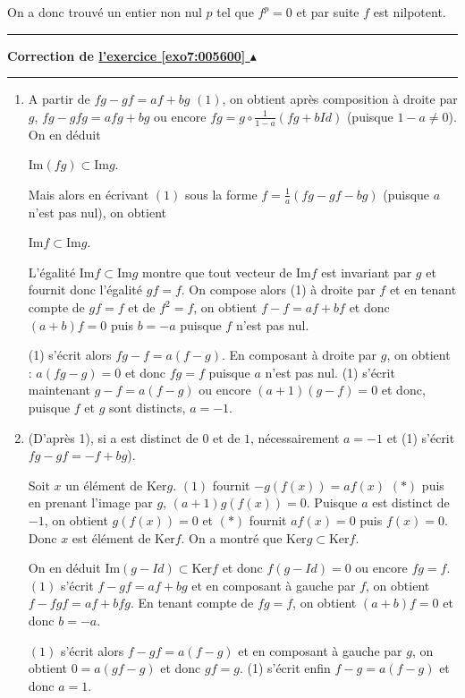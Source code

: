 \documentclass[11pt,a4paper]{article}
\newcounter{exo}
\newcommand{\correction}[1]{\hypertarget{cor7:#1}{}\label{cor7:#1}{\bf Correction de \hyperlink{exo7:#1}{l'exercice \ref{exo7:#1} $\blacktriangle$}}\vspace{1mm}\hrule\vspace{1mm}}
\newcommand{\fincorrection}{\vspace{1mm}\hrule\vspace*{7mm}}
\begin{document}
On a donc trouvé un entier non nul $p$ tel que $f^p=0$ et par suite $f$ est nilpotent.
\fincorrection
\correction{005600}
\begin{enumerate}
 \item  A partir de $fg-gf=af+bg$ $(1)$, on obtient après composition à droite par $g$, $fg-gfg = afg + bg$ ou encore $fg=g\circ\frac{1}{1-a}(fg + bId)$ (puisque $1 - a\neq0$). On en déduit

\begin{center} 
$\text{Im}(fg)\subset\text{Im}g$.
\end{center}

Mais alors en écrivant $(1)$ sous la forme $f=\frac{1}{a}(fg- gf -bg)$ (puisque $a$ n'est pas nul), on obtient

\begin{center}
$\text{Im}f\subset\text{Im}g$.
\end{center}

L'égalité $\text{Im}f\subset\text{Im}g$ montre que tout vecteur de $\text{Im}f$ est invariant par $g$ et  fournit donc l'égalité $gf = f$. On compose alors (1) à droite par $f$ et en tenant compte de $gf = f$ et de $f^2 = f$, on obtient $f - f = af + bf$ et donc $(a+b)f = 0$ puis $b=-a$ puisque $f$ n'est pas nul.

(1) s'écrit alors $fg - f = a(f-g)$. En composant à droite par $g$, on obtient : $a(fg - g) = 0$ et donc $fg = f$ puisque $a$ n'est pas nul. (1) s'écrit maintenant $g-f = a(f-g)$ ou encore $(a+1)(g - f) = 0$ et donc, puisque $f$ et $g$ sont distincts, $a = -1$.

\item  (D'après 1), si a est distinct de $0$ et de $1$, nécessairement $a = -1$ et (1) s'écrit $fg - gf =-f +bg$).

Soit $x$ un élément de $\text{Ker}g$. $(1)$ fournit $-g(f(x)) = af(x)$ $(*)$ puis en prenant l'image par $g$, $(a+1)g(f(x)) = 0$. Puisque $a$ est distinct de $-1$, on obtient $g(f(x)) = 0$ et $(*)$ fournit $af(x) = 0$ puis $f(x) = 0$. Donc $x$ est élément de $\text{Ker}f$. On a montré que $\text{Ker}g\subset\text{Ker}f$.

On en déduit $\text{Im}(g-Id)\subset\text{Ker}f$ et donc $f(g-Id) =0$ ou encore $fg = f$. $(1)$ s'écrit $f - gf = af + bg$ et en composant à gauche par $f$, on obtient $f - fgf = af + bfg$. En tenant compte de $fg = f$, on obtient  $(a+b)f = 0$ et donc $b = -a$.

$(1)$ s'écrit alors $f - gf = a(f - g)$ et en composant à gauche par $g$, on obtient $0 = a(gf - g)$ et donc $gf = g$. (1) s'écrit enfin $f-g = a(f-g)$ et donc $a = 1$.


\end{enumerate}
\end{document}
